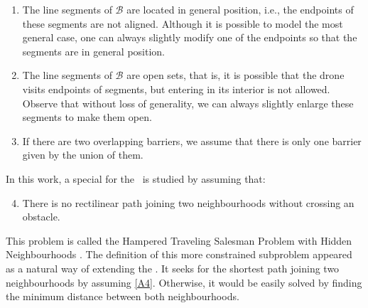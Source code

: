 \documentclass[a4paper,  review, authoryear, 1p.]{elsarticle}
\newcommand{\SPPN}{{\sf{H-SPPN}\xspace }}
\newcommand{\TSPHN}{{\sf{H-TSPHN}\xspace }}
\newcommand{\TSPN}{{\sf{H-TSPN}\xspace }}
\newcommand{\CV}[1]{{\color{red}#1}}
\begin{document}
		\begin{enumerate}[label=\textbf{A\arabic*},ref=\textbf{A\arabic*}]
			\item \label{A1}The line segments of $\mathcal B$ are located in general position, i.e., the endpoints of these segments are not aligned. Although it is possible to model the most general case, one can always slightly modify one of the endpoints so that the segments are in general position.
			\item The line segments of $\mathcal B$ are open sets, that is, it is possible that the drone visits endpoints of segments, but entering  in its interior is not allowed. Observe that without loss of generality, we can always slightly enlarge these segments to make them open.
			\item \label{A3}If there are two overlapping barriers, we assume that there is only one barrier given by the union of them.
		\end{enumerate}

		\CV{In this work, a special for the \TSPN \ is studied by assuming that:
		\begin{enumerate}[label=\textbf{A\arabic*}, ref=\textbf{A\arabic*}]
			\setcounter{enumi}{3}
			\item \label{A4}There is no rectilinear path joining two neighbourhoods without crossing an obstacle.
		\end{enumerate} 
		This problem is called the Hampered Traveling Salesman Problem with Hidden Neighbourhoods \TSPHN. The definition of this more constrained subproblem appeared as a natural way of extending the \SPPN. It seeks for the shortest path joining two neighbourhoods by assuming \ref{A4}. Otherwise, it would be easily solved by finding the minimum distance between both neighbourhoods.

		}

		
\end{document}
